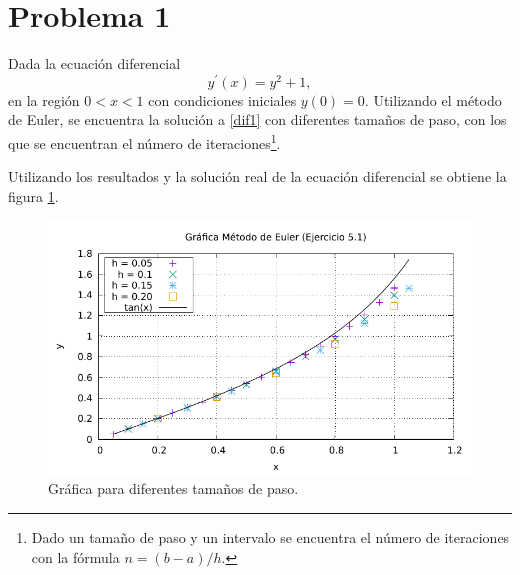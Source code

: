 \section*{Problema 1}
Dada la ecuación diferencial
\begin{equation}
	y^{\prime} (x) = y^2 + 1, \label{dif1}
\end{equation}
en la región $0 < x < 1$ con condiciones iniciales $y(0) = 0$. Utilizando el método de Euler, se encuentra la solución a \eqref{dif1} con diferentes tamaños de paso, con los que se encuentran el número de iteraciones\footnote{Dado un tamaño de paso y un intervalo se encuentra el número de iteraciones con la fórmula $n = (b - a)/h$.}. 

Utilizando los resultados y la solución real de la ecuación diferencial se obtiene la figura \ref{ej1}.
\begin{figure}[H]
	\centering
	\includegraphics[scale=1]{../img/ej5-1.pdf}
	\caption{Gráfica para diferentes tamaños de paso.}
	\label{ej1}
\end{figure}

